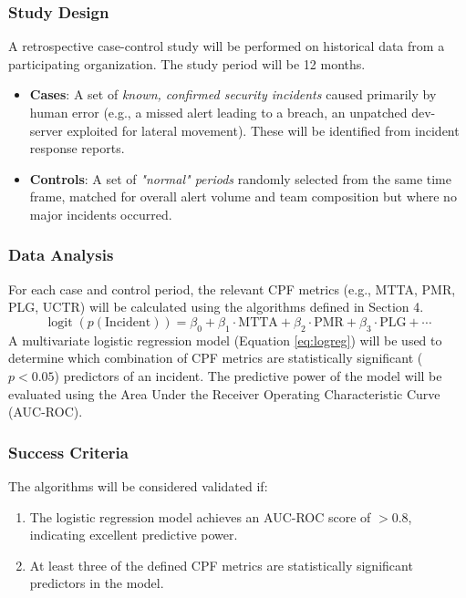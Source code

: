 \documentclass[11pt, a4paper]{article}
\DeclareMathOperator{\logit}{logit}
\begin{document}
\subsubsection{Study Design}
A retrospective case-control study will be performed on historical data from a participating organization. The study period will be 12 months.
\begin{itemize}
    \item \textbf{Cases}: A set of \textit{known, confirmed security incidents} caused primarily by human error (e.g., a missed alert leading to a breach, an unpatched dev-server exploited for lateral movement). These will be identified from incident response reports.
    \item \textbf{Controls}: A set of \textit{"normal" periods} randomly selected from the same time frame, matched for overall alert volume and team composition but where no major incidents occurred.
\end{itemize}

\subsubsection{Data Analysis}
For each case and control period, the relevant CPF metrics (e.g., MTTA, PMR, PLG, UCTR) will be calculated using the algorithms defined in Section 4.
\begin{equation}
\label{eq:logreg}
\logit(p(\text{Incident})) = \beta_0 + \beta_1 \cdot \text{MTTA} + \beta_2 \cdot \text{PMR} + \beta_3 \cdot \text{PLG} + \cdots
\end{equation}
A multivariate logistic regression model (Equation \ref{eq:logreg}) will be used to determine which combination of CPF metrics are statistically significant ($p < 0.05$) predictors of an incident. The predictive power of the model will be evaluated using the Area Under the Receiver Operating Characteristic Curve (AUC-ROC).

\subsubsection{Success Criteria}
The algorithms will be considered validated if:
\begin{enumerate}
    \item The logistic regression model achieves an AUC-ROC score of $>0.8$, indicating excellent predictive power.
    \item At least three of the defined CPF metrics are statistically significant predictors in the model.
\end{enumerate}
\end{document}
